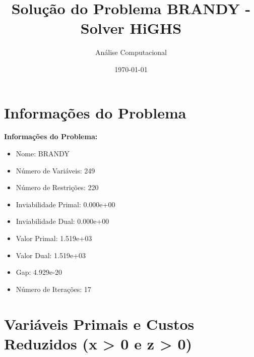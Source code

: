 \documentclass[12pt]{article}
\title{Solução do Problema BRANDY - Solver HiGHS}
\author{Análise Computacional}
\date{\today}
\begin{document}
\maketitle

\section{Informações do Problema}

\textbf{Informações do Problema:}
\begin{itemize}
\item Nome: BRANDY
\item Número de Variáveis: 249
\item Número de Restrições: 220
\item Inviabilidade Primal: 0.000e+00
\item Inviabilidade Dual: 0.000e+00
\item Valor Primal: 1.519e+03
\item Valor Dual: 1.519e+03
\item Gap: 4.929e-20
\item Número de Iterações: 17
\end{itemize}


\section{Variáveis Primais e Custos Reduzidos (x > 0 e z > 0)}
\end{document}

